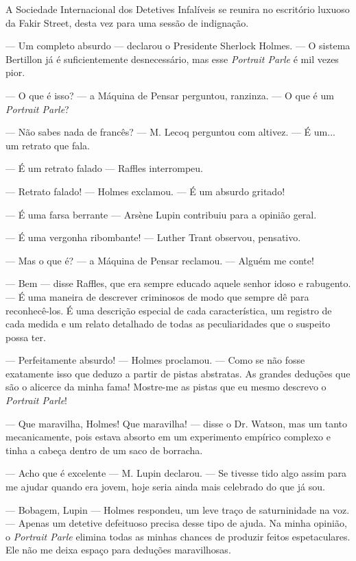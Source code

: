 
A Sociedade Internacional dos Detetives Infalíveis se reunira no
escritório luxuoso da Fakir Street, desta vez para uma sessão de
indignação.

--- Um completo absurdo --- declarou o Presidente Sherlock Holmes. --- O
sistema Bertillon já é suficientemente desnecessário, mas esse
\emph{Portrait Parle} é mil vezes pior.

--- O que é isso? --- a Máquina de Pensar perguntou, ranzinza. --- O que
é um \emph{Portrait Parle}?

--- Não sabes nada de francês? --- M. Lecoq perguntou com altivez. --- É
um... um retrato que fala.

--- É um retrato falado --- Raffles interrompeu.

--- Retrato falado! --- Holmes exclamou. --- É um absurdo gritado!

--- É uma farsa berrante --- Arsène Lupin contribuiu para a opinião
geral.

--- É uma vergonha ribombante! --- Luther Trant observou, pensativo.

--- Mas o que é? --- a Máquina de Pensar reclamou. --- Alguém me conte!

--- Bem --- disse Raffles, que era sempre educado aquele senhor idoso e
rabugento. --- É uma maneira de descrever criminosos de modo que sempre
dê para reconhecê-los. É uma descrição especial de cada característica,
um registro de cada medida e um relato detalhado de todas as
peculiaridades que o suspeito possa ter.

--- Perfeitamente absurdo! --- Holmes proclamou. --- Como se não fosse
exatamente isso que deduzo a partir de pistas abstratas. As grandes
deduções que são o alicerce da minha fama! Mostre-me as pistas que eu
mesmo descrevo o \emph{Portrait Parle}!

--- Que maravilha, Holmes! Que maravilha! --- disse o Dr. Watson, mas um
tanto mecanicamente, pois estava absorto em um experimento empírico
complexo e tinha a cabeça dentro de um saco de borracha.

--- Acho que é excelente --- M. Lupin declarou. --- Se tivesse tido algo
assim para me ajudar quando era jovem, hoje seria ainda mais celebrado
do que já sou.

--- Bobagem, Lupin --- Holmes respondeu, um leve traço de saturninidade
na voz. --- Apenas um detetive defeituoso precisa desse tipo de ajuda.
Na minha opinião, o \emph{Portrait Parle} elimina todas as minhas
chances de produzir feitos espetaculares. Ele não me deixa espaço para
deduções maravilhosas.

